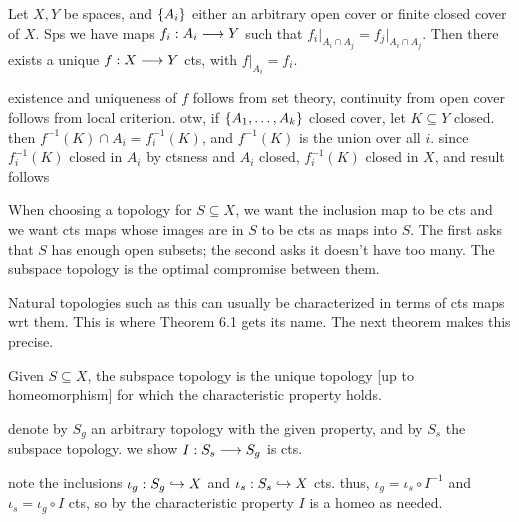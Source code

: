 \begin{lm}[title=Gluing Lemma]
    Let $ X, Y $ be spaces, and $ \left\{{A_{i}}\right\} $ either an arbitrary open cover or
    finite closed cover of $ X $. Sps we have maps $ f_{i}:A_{i}\longrightarrow Y $ such
    that $ f_{i}\rvert_{A_{i}\cap A_{j}} = f_{j}\rvert_{A_{i}\cap A_{j}} $. Then
    there exists a unique $ f:X \longrightarrow Y $ cts, with $ f\rvert_{A_{i}} = f_{i} $.
\end{lm}

\begin{pf}[source=Primary Source Material]
    existence and uniqueness of $ f $ follows from set theory, continuity from
    open cover follows from local criterion. otw, if $ \left\{{A_{1},\dots,A_{k}}\right\} $
    closed cover, let $ K \subseteq Y $ closed. then $ f^{-1}(K) \cap A_{i}
    = f_{i}^{-1}(K) $, and $ f^{-1}(K) $ is the union over all $ i $. since
    $ f_{i}^{-1}(K) $ closed in $ A_{i} $ by ctsness and $ A_{i} $ closed,
    $ f_{i}^{-1}(K) $ closed in $ X $, and result follows
\end{pf}

When choosing a topology for $ S \subseteq X $, we want the inclusion map to be
cts and we want cts maps whose images are in $ S $ to be cts as maps into $ S $.
The first asks that $ S $ has enough open subsets; the second asks it doesn't
have too many. The subspace topology is the optimal compromise between them.

Natural topologies such as this can usually be characterized in terms of cts maps
wrt them. This is where Theorem 6.1 gets its name. The next theorem makes this
precise.

\newpage
\begin{prop}
    Given $ S \subseteq X $, the subspace topology is the unique topology [up to
    homeomorphism] for which the characteristic property holds.
\end{prop}

\begin{pf}[source=Primary Source Material]
    denote by $ S_{g} $ an arbitrary topology with the given property, and by
    $ S_{s} $ the subspace topology. we show $ I:S_{s}\longrightarrow S_{g} $ is cts.

    note the inclusions $ \iota_{g}:S_{g} \hookrightarrow X $ and $ \iota_{s}:S_{s} \hookrightarrow X $
    cts. thus, $ \iota_{g}=\iota_{s}\circ I^{-1} $ and $ \iota_{s}=\iota_{g}
    \circ I $ cts, so by the characteristic property $ I $ is a homeo as needed.
\end{pf}

